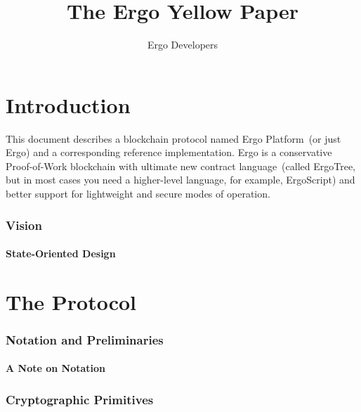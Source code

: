 \documentclass[]{article}   %
\newcommand{\authnote}[2]{\marginpar{\parbox{\marginparwidth}{\tiny %
  \textsf{#1 {\textcolor{blue}{notes: #2}}}}}%
  \textcolor{blue}{\textbf{\dag}}}
\newcommand{\authnote}[2]{
  \textsf{#1 \textcolor{blue}{: #2}}}
\newcommand{\authnote}[2]{}
\newcommand{\knote}[1]{{\authnote{\textcolor{green}{Alex notes}}{#1}}}
\newcommand{\ergo}{Ergo}
\begin{document}
\title{The \ergo{} Yellow Paper}
\author{Ergo Developers}
\maketitle

\newpage
\tableofcontents


\part{Introduction}
\label{part-intro}

This document describes a blockchain protocol named Ergo Platform~(or just Ergo) and a corresponding
reference implementation. Ergo is a conservative Proof-of-Work blockchain with ultimate new contract language~(called
ErgoTree, but in most cases you need a higher-level language, for example, ErgoScript) and better support for lightweight
and secure modes of operation.

\section{Vision}

\knote{Write what is Ergo in general, why is it needed and for whom.}


\subsection{State-Oriented Design}
\knote{Write about boxes as first-class citizens.}



\part{The Protocol}
\label{part-protocol}


\section{Notation and Preliminaries}

\subsection{A Note on Notation}

\knote{say about coin/box/output}


\section{Cryptographic Primitives}
\end{document}
